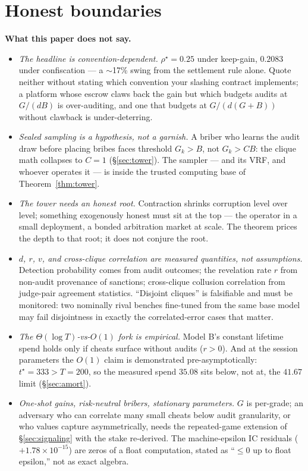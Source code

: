 \documentclass[11pt,a4paper]{article}
\begin{document}
\section{Honest boundaries}\label{sec:boundaries}
\begin{boundary}
\textbf{What this paper does not say.}
\begin{itemize}[leftmargin=1.6em,itemsep=2pt]
\item \emph{The headline is convention-dependent.} $\rho^\star = 0.25$ under keep-gain, $0.2083$ under confiscation --- a $\sim$17\% swing from the settlement rule alone. Quote neither without stating which convention your slashing contract implements; a platform whose escrow claws back the gain but which budgets audits at $G/(dB)$ is over-auditing, and one that budgets at $G/(d(G{+}B))$ without clawback is under-deterring.
\item \emph{Sealed sampling is a hypothesis, not a garnish.} A briber who learns the audit draw before placing bribes faces threshold $G_k > B$, not $G_k > CB$: the clique math collapses to $C{=}1$ (\S\ref{sec:tower}). The sampler --- and its VRF, and whoever operates it --- is inside the trusted computing base of Theorem~\ref{thm:tower}.
\item \emph{The tower needs an honest root.} Contraction shrinks corruption level over level; something exogenously honest must sit at the top --- the operator in a small deployment, a bonded arbitration market at scale. The theorem prices the depth to that root; it does not conjure the root.
\item \emph{$d$, $r$, $v$, and cross-clique correlation are measured quantities, not assumptions.} Detection probability comes from audit outcomes; the revelation rate $r$ from non-audit provenance of sanctions; cross-clique collusion correlation from judge-pair agreement statistics. ``Disjoint cliques'' is falsifiable and must be monitored: two nominally rival benches fine-tuned from the same base model may fail disjointness in exactly the correlated-error cases that matter.
\item \emph{The $\Theta(\log T)$-vs-$O(1)$ fork is empirical.} Model B's constant lifetime spend holds only if cheats surface without audits ($r>0$). And at the session parameters the $O(1)$ claim is demonstrated pre-asymptotically: $t^\star = 333 > T = 200$, so the measured spend $35.08$ sits below, not at, the $41.67$ limit (\S\ref{sec:amort}).
\item \emph{One-shot gains, risk-neutral bribers, stationary parameters.} $G$ is per-grade; an adversary who can correlate many small cheats below audit granularity, or who values capture asymmetrically, needs the repeated-game extension of \S\ref{sec:signaling} with the stake re-derived. The machine-epsilon IC residuals ($+1.78\times 10^{-15}$) are zeros of a float computation, stated as ``$\le 0$ up to float epsilon,'' not as exact algebra.
\end{itemize}
\end{boundary}
\end{document}

